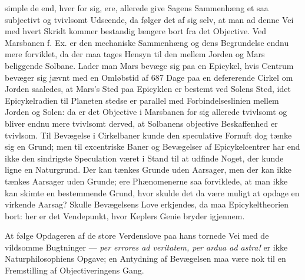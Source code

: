 \documentclass[12pt,a4paper]{book}
\begin{document}
simple de end, hver for sig, ere, allerede give Sagens Sammenhæng et saa
subjectivt og tvivlsomt Udseende, da følger det af sig selv, at man ad
denne Vei med hvert Skridt kommer bestandig længere bort fra det
Objective. Ved Marsbanen f. Ex. er den mechaniske Sammenhæng og dens
Begrundelse endnu mere forviklet, da der maa tages Hensyn til den mellem
Jorden og Mars beliggende Solbane. Lader man Mars bevæge sig paa en
Epicykel, hvis Centrum bevæger sig jævnt med en Omløbstid af 687 Dage
paa en defererende Cirkel om Jorden saaledes, at Mars's Sted paa
Epicyklen er bestemt ved Solens Sted, idet Epicykelradien til Planeten
stedse er parallel med Forbindelseslinien mellem Jorden og Solen: da er
det Objective i Marsbanen for sig allerede tvivlsomt og bliver endnu
mere tvivlsomt derved, at Solbanens objective Beskaffenhed er tvivlsom.
Til Bevægelse i Cirkelbaner kunde den speculative Fornuft dog tænke sig
en Grund; men til excentriske Baner og Bevægelser af Epicykelcentrer har
end ikke den sindrigste Speculation været i Stand til at udfinde Noget,
der kunde ligne en Naturgrund. Der kan tænkes Grunde uden Aarsager, men
der kan ikke tænkes Aarsager uden Grunde; ere Phænomenerne saa
forviklede, at man ikke kan skimte en bestemmende Grund, hvor skulde det
da være muligt at opdage en virkende Aarsag? Skulle Bevægelsens Love
erkjendes, da maa Epicykeltheorien bort: her er det Vendepunkt, hvor
Keplers Genie bryder igjennem.

At følge Opdageren af de store Verdenslove paa hans tornede Vei med de
vildsomme Bugtninger --- \textit{per errores ad veritatem, per ardua ad
astra!} er ikke Naturphilosophiens Opgave; en Antydning af Bevægelsen
maa være nok til en Fremstilling af Objectiveringens Gang.
\end{document}
